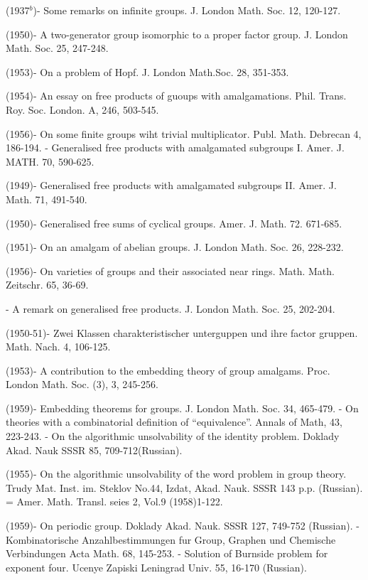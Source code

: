 \begin{thebibliography}{99}
  (1937$^b$)- Some remarks on infinite groups. J. London
  Math. Soc. 12, 120-127. 

  (1950)- A two-generator group isomorphic to a proper
  factor group. J. London Math. Soc. 25, 247-248. 

  (1953)- On a problem of Hopf. J. London Math.Soc. 28,
  351-353. 

  (1954)- An essay on free products of guoups with
  amalgamations. Phil. Trans. Roy. Soc. London. A, 246, 503-545. 

  (1956)- On some finite groups wiht trivial
  multiplicator. Publ. Math. Debrecan 4, 186-194. 
- Generalised free products with
  amalgamated subgroups I. Amer. J. MATH. 70, 590-625. 

  (1949)- Generalised free products with amalgamated
  subgroups II. Amer. J. Math. 71, 491-540. 

  (1950)- Generalised free sums of cyclical
  groups. Amer. J. Math. 72. 671-685. 

  (1951)- On an amalgam of abelian groups. J. London
  Math. Soc. 26, 228-232. 

  (1956)- On varieties of groups and their associated
  near rings. Math. Math. Zeitschr. 65, 36-69. 

- A remark on
  generalised free products. J. London Math. Soc. 25, 202-204. 

  (1950-51)- Zwei Klassen charakteristischer unterguppen
  und ihre factor gruppen. Math. Nach. 4, 106-125. 

  (1953)- A contribution to the embedding theory of group
  amalgams. Proc. London Math. Soc. (3), 3, 245-256. 

  (1959)- Embedding theorems for groups. J. London
  Math. Soc. 34, 465-479. 
\pageoriginale - On theories with a
  combinatorial 
  definition of ``equivalence''. Annals of Math, 43, 223-243. 
- On the algorithmic unsolvability of
  the identity problem. Doklady Akad. Nauk SSSR 85, 709-712(Russian). 

  (1955)- On the algorithmic unsolvability of the word
  problem in group theory. Trudy Mat. Inst. im. Steklov No.44, Izdat,
  Akad. Nauk. SSSR 143 p.p. (Russian). = Amer. Math. Transl. seies 2,
  Vol.9 (1958)1-122.

  (1959)- On periodic group. Doklady Akad. Nauk. SSSR
  127, 749-752 (Russian). 
- Kombinatorische Anzahlbestimmungen
  fur Group, Graphen und Chemische Verbindungen Acta Math. 68,
  145-253. 
- Solution of Burnside problem for
  exponent four. Ucenye Zapiski Leningrad Univ. 55, 16-170 (Russian). 


\end{thebibliography}
